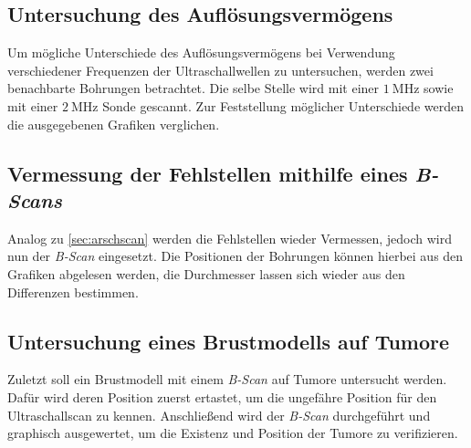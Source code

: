 \subsection{Untersuchung des Auflösungsvermögens}
Um mögliche Unterschiede des Auflösungsvermögens bei Verwendung verschiedener Frequenzen der Ultraschallwellen
zu untersuchen, werden zwei benachbarte Bohrungen betrachtet. Die selbe Stelle wird mit einer $\qty{1}{\mega\hertz}$
sowie mit einer $\qty{2}{\mega\hertz}$ Sonde gescannt. Zur Feststellung möglicher Unterschiede werden die ausgegebenen
Grafiken verglichen.

\subsection{Vermessung der Fehlstellen mithilfe eines \textit{B-Scans}}
Analog zu \ref{sec:arschscan} werden die Fehlstellen wieder Vermessen, jedoch
wird nun der \textit{B-Scan} eingesetzt. Die Positionen der Bohrungen können hierbei aus den Grafiken abgelesen werden,
die Durchmesser lassen sich wieder aus den Differenzen bestimmen.

\subsection{Untersuchung eines Brustmodells auf Tumore}
Zuletzt soll ein Brustmodell mit einem \textit{B-Scan} auf Tumore untersucht werden. Dafür wird deren Position
zuerst ertastet, um die ungefähre Position für den Ultraschallscan zu kennen.
Anschließend wird der \textit{B-Scan} durchgeführt und graphisch ausgewertet, um die Existenz und Position
der Tumore zu verifizieren.